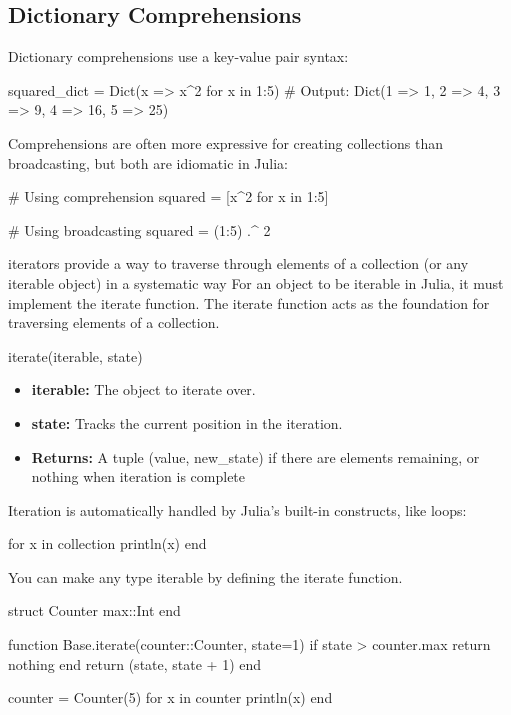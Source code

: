 \documentclass{report}
\begin{document}
     \subsection{Dictionary Comprehensions}
     \bigbreak \noindent 
     Dictionary comprehensions use a key-value pair syntax:
     \bigbreak \noindent 
     \begin{jlcode}
     squared_dict = Dict(x => x^2 for x in 1:5)
     # Output: Dict(1 => 1, 2 => 4, 3 => 9, 4 => 16, 5 => 25)
     \end{jlcode}
     \bigbreak \noindent 
     Comprehensions are often more expressive for creating collections than broadcasting, but both are idiomatic in Julia:
     \bigbreak \noindent 
     \begin{jlcode}
         # Using comprehension
         squared = [x^2 for x in 1:5]

         # Using broadcasting
         squared = (1:5) .^ 2
     \end{jlcode}














     \pagebreak 
     \bigbreak \noindent
     iterators provide a way to traverse through elements of a collection (or any iterable object) in a systematic way
     \bigbreak \noindent 
     For an object to be iterable in Julia, it must implement the iterate function. The iterate function acts as the foundation for traversing elements of a collection.
     \bigbreak \noindent 
     \begin{jlcode}
     iterate(iterable, state)
     \end{jlcode}
     \begin{itemize}
         \item \textbf{iterable:} The object to iterate over.
         \item \textbf{state:} Tracks the current position in the iteration.
         \item \textbf{Returns:} A tuple (value, new\_state) if there are elements remaining, or nothing when iteration is complete
     \end{itemize}
     \bigbreak \noindent 
     Iteration is automatically handled by Julia's built-in constructs, like loops:
     \bigbreak \noindent 
     \begin{jlcode}
         for x in collection
             println(x)
         end
     \end{jlcode}
     \bigbreak \noindent 
     You can make any type iterable by defining the iterate function.
     \bigbreak \noindent 
     \begin{jlcode}
 struct Counter
    max::Int
end

function Base.iterate(counter::Counter, state=1)
    if state > counter.max
        return nothing
    end
    return (state, state + 1)
end

counter = Counter(5)
for x in counter
    println(x)
end
     \end{jlcode}
\end{document}
